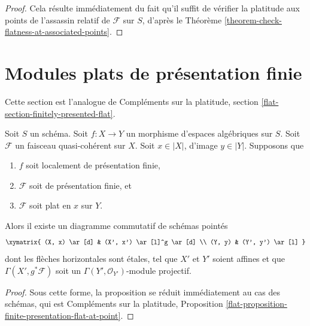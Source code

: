 \begin{proof}
Cela résulte immédiatement du fait qu'il suffit de vérifier la
platitude aux points de l'assassin relatif de $\mathcal{F}$
sur $S$, d'après le
Théorème \ref{theorem-check-flatness-at-associated-points}.
\end{proof}




\section{Modules plats de présentation finie}
\label{section-finitely-presented-flat}

\noindent
Cette section est l'analogue de Compléments sur la platitude, section
\ref{flat-section-finitely-presented-flat}.

\begin{proposition}
\label{proposition-finite-presentation-flat-at-point}
Soit $S$ un schéma.
Soit $f : X \to Y$ un morphisme d'espaces algébriques sur $S$.
Soit $\mathcal{F}$ un faisceau quasi-cohérent sur $X$.
Soit $x \in |X|$, d'image $y \in |Y|$.
Supposons que
\begin{enumerate}
\item $f$ soit localement de présentation finie,
\item $\mathcal{F}$ soit de présentation finie, et
\item $\mathcal{F}$ soit plat en $x$ sur $Y$.
\end{enumerate}
Alors il existe un diagramme commutatif de schémas pointés
$$
\xymatrix{
(X, x) \ar[d] & (X', x') \ar[l]^g \ar[d] \\
(Y, y) & (Y', y') \ar[l]
}
$$
dont les flèches horizontales sont \'etales, tel que $X'$ et $Y'$
soient affines et que
$\Gamma(X', g^*\mathcal{F})$ soit un
$\Gamma(Y', \mathcal{O}_{Y'})$-module projectif.
\end{proposition}

\begin{proof}
Sous cette forme, la proposition se réduit immédiatement
au cas des schémas, qui est
Compléments sur la platitude, Proposition
\ref{flat-proposition-finite-presentation-flat-at-point}.
\end{proof}

